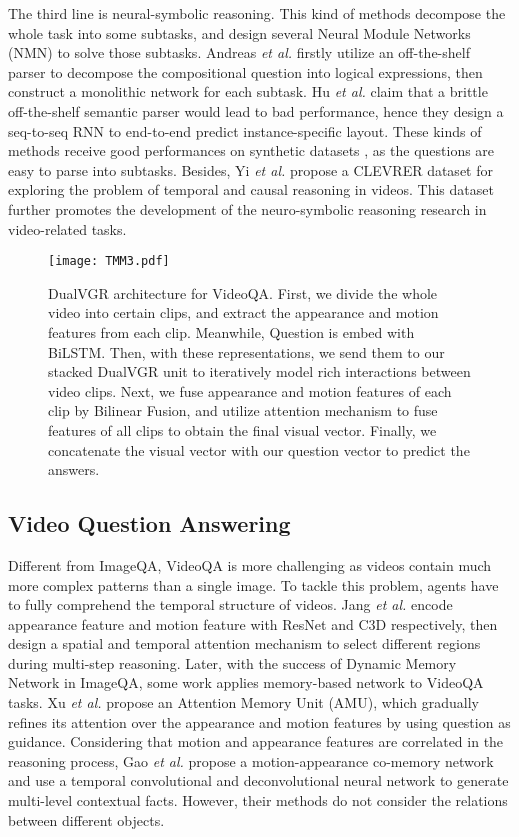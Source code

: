 \documentclass[journal]{IEEEtran}
\begin{document}
The third line is neural-symbolic reasoning. This kind of methods decompose the whole task into some subtasks, and design several Neural Module Networks (NMN) \cite{andreas2016neural,hu2017learning,yi2018neural,gan2017vqs,mao2018neuro,yi2019clevrer,chen2021grounding} to solve those subtasks. Andreas \textit{et al.} \cite{andreas2016neural} firstly utilize an off-the-shelf parser to decompose the compositional question into logical expressions, then construct a monolithic network for each subtask. Hu \textit{et al.} \cite{hu2017learning} claim that a brittle off-the-shelf semantic parser would lead to bad performance, hence they design a seq-to-seq RNN to end-to-end predict instance-specific layout. These kinds of methods receive good performances on synthetic datasets \cite{johnson2017clevr}, as the questions are easy to parse into subtasks. Besides, Yi \textit{et al.} \cite{yi2019clevrer} propose a CLEVRER dataset for exploring the problem of temporal and causal reasoning in videos. This dataset further promotes the development of the neuro-symbolic reasoning research in video-related tasks.
\begin{figure*}[ht]
    \centering
\texttt{[image: TMM3.pdf]}
    \caption{DualVGR architecture for VideoQA. First, we divide the whole video into certain clips, and extract the appearance and motion features from each clip. Meanwhile, Question is embed with BiLSTM. Then, with these representations, we send them to our stacked DualVGR unit to iteratively model rich interactions between video clips. Next, we fuse appearance and motion features of each clip by Bilinear Fusion, and utilize attention mechanism to fuse features of all clips to obtain the final visual vector. Finally, we concatenate the visual vector with our question vector to predict the answers.}
    \label{fig:Framework}
\end{figure*}
\subsection{Video Question Answering}
Different from ImageQA, VideoQA is more challenging as videos contain much more complex patterns than a single image. To tackle this problem, agents have to fully comprehend the temporal structure of videos. Jang \textit{et al.} \cite{jang2017tgif} encode appearance feature and motion feature with ResNet \cite{he2016identity} and C3D \cite{ji20123d} respectively, then design a spatial and temporal attention mechanism to select different regions during multi-step reasoning. Later, with the success of Dynamic Memory Network \cite{xiong2016dynamic} in ImageQA, some work \cite{xu2017video, gao2018motion} applies memory-based network to VideoQA tasks. Xu \textit{et al.} \cite{xu2017video} propose an Attention Memory Unit (AMU), which gradually refines its attention over the appearance and motion features by using question as guidance. Considering that motion and appearance features are correlated in the reasoning process, Gao \textit{et al.} \cite{gao2018motion} propose a motion-appearance co-memory network and use a temporal convolutional and deconvolutional neural network to generate multi-level contextual facts. However, their methods do not consider the relations between different objects.
\end{document}
